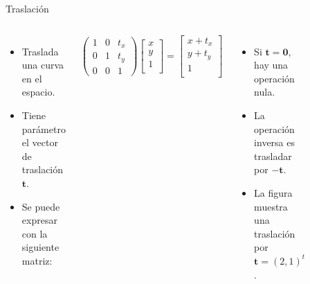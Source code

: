 \begin{frame}{Traslación}
\begin{columns}
\begin{itemize}
    \item Traslada una curva en el espacio.
    \item Tiene parámetro el vector de traslación $\mathbf{t}$.
    \item Se puede expresar con la siguiente matriz:
\end{itemize}
$$
\begin{pmatrix}
1 & 0 & t_x\\
0 & 1 & t_y\\
0 & 0 & 1
\end{pmatrix}
\begin{bmatrix}
x \\
y \\
1 \\
\end{bmatrix}
=
\begin{bmatrix}
x + t_x \\
y + t_y \\
1 \\
\end{bmatrix}
$$
\begin{itemize}
    \item Si $\mathbf{t} = \mathbf{0}$, hay una operación nula.
    \item La operación inversa es trasladar por $-\mathbf{t}$.
    \item La figura muestra una traslación por $\mathbf{t} = (2, 1)^t$.
\end{itemize}
\begin{figure}[htp]
 \centering
 \begin{subfigure}[b]{0.4\textwidth}
   \includegraphics[width=\textwidth]{img/Square}

\end{subfigure}
\end{figure}
\end{columns}
\end{frame}

